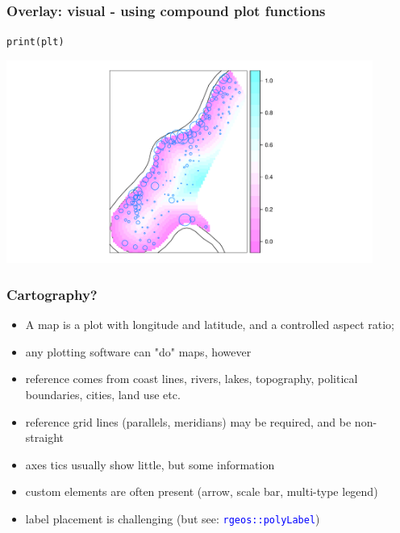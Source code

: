 \documentclass[xcolor=table, xcolor=dvipsnames]{beamer}\usepackage[]{graphicx}\usepackage[]{color}
\makeatletter
\newcommand{\hlstd}[1]{\textcolor[rgb]{0,0,0}{#1}}
\newcommand{\hlkwd}[1]{\textcolor[rgb]{0,0,1}{#1}}
\newenvironment{kframe}{%
 \def\at@end@of@kframe{}%
 \ifinner\ifhmode%
  \def\at@end@of@kframe{\end{minipage}}%
  \begin{minipage}{\columnwidth}%
 \fi\fi%
 \def\FrameCommand##1{\hskip\@totalleftmargin \hskip-\fboxsep
 \colorbox{shadecolor}{##1}\hskip-\fboxsep
     \hskip-\linewidth \hskip-\@totalleftmargin \hskip\columnwidth}%
 \MakeFramed {\advance\hsize-\width
   \@totalleftmargin\z@ \linewidth\hsize
   \@setminipage}}%
 {\par\unskip\endMakeFramed%
 \at@end@of@kframe}
\newenvironment{knitrout}{}{} %
\newcommand{\rcode}[1]{\texttt{\textcolor{Blue}{#1}}} %
\makeatother
\begin{document}
\begin{frame}[fragile]\frametitle{Overlay: visual - using compound plot functions}
\begin{knitrout}
\color{fgcolor}\begin{kframe}
\begin{alltt}
\hlkwd{print}\hlstd{(plt)}
\end{alltt}
\end{kframe}
\end{knitrout}
\begin{center}
\includegraphics[width=0.9\textwidth]{./externalfig/Plotting_with_the_sp_package_print.pdf}
\end{center}
\end{frame}


\begin{frame}[fragile]\frametitle{Cartography?}
\pause
\begin{itemize}[<+->]
\item A map is a plot with longitude and latitude, and a controlled aspect ratio; 
\item any plotting software can "do" maps, however
\item reference comes from coast lines, rivers, lakes, topography, political boundaries, cities, land use etc.
\item reference grid lines (parallels, meridians) may be required, and be non-straight
\item axes tics usually show little, but some information
\item custom elements are often present (arrow, scale bar, multi-type legend)
\item label placement is challenging (but see: \rcode{rgeos::polyLabel})
\end{itemize}
\end{frame}
\end{document}
